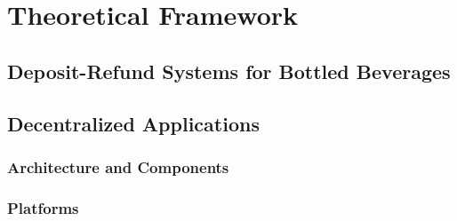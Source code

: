 
\chapter{Theoretical Framework}

\section{Deposit-Refund Systems for Bottled Beverages}


\section{Decentralized Applications}

\subsection{Architecture and Components}
\subsection{Platforms}